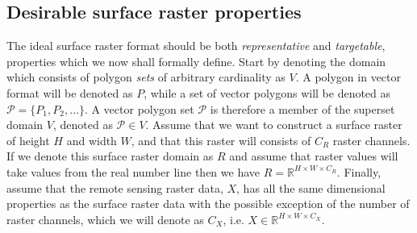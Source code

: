 \subsection{Desirable surface raster properties}
The ideal surface raster format should be both \emph{representative} and \emph{targetable}, properties which we now shall formally define.
Start by denoting the domain which consists of polygon \textit{sets} of arbitrary cardinality as $V$.
A polygon in vector format will be denoted as $P$, while a set of vector polygons will be denoted as $\mathcal{P} = \{P_1, P_2, \dots\}$.
A vector polygon set $\mathcal{P}$ is therefore a member of the superset domain $V$, denoted as $\mathcal{P} \in V$.
Assume that we want to construct a surface raster of height $H$ and width $W$, and that this raster will consists of $C_R$ raster channels.
If we denote this surface raster domain as $R$ and assume that raster values will take values from the real number line then we have $R = \mathbb{R}^{H \times W \times C_R}$.
Finally, assume that the remote sensing raster data, $X$, has all the same dimensional properties as the surface raster data with the possible exception of the number of raster channels, which we will denote as $C_X$, i.e. $X \in \mathbb{R}^{H \times W \times C_X}$.
